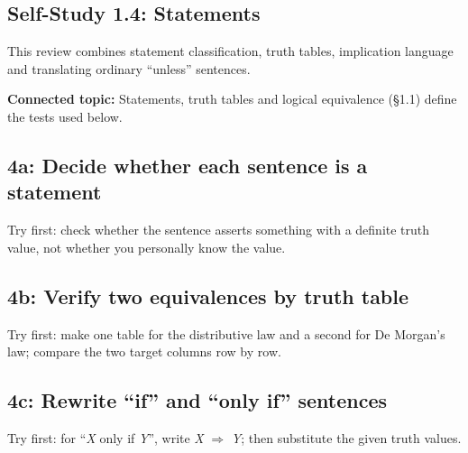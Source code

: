 \documentclass[11pt]{article}
\begin{document}
\begin{keepsection}
\section{Self-Study 1.4: Statements}

This review combines statement classification, truth tables, implication language and translating ordinary “unless” sentences.

\textbf{Connected topic:} Statements, truth tables and logical equivalence (§1.1) define the tests used below.

\begin{keepsection}
\subsection{4a: Decide whether each sentence is a statement}

Try first: check whether the sentence asserts something with a definite truth value, not whether you personally know the value.

\end{keepsection}

\begin{keepsection}
\subsection{4b: Verify two equivalences by truth table}

Try first: make one table for the distributive law and a second for De Morgan’s law; compare the two target columns row by row.

\end{keepsection}

\begin{keepsection}
\subsection{4c: Rewrite “if” and “only if” sentences}

Try first: for “\textit{X} only if \textit{Y}”, write \textit{X} \ensuremath{\Rightarrow} \textit{Y}; then substitute the given truth values.


\end{keepsection}
\end{keepsection}
\end{document}
